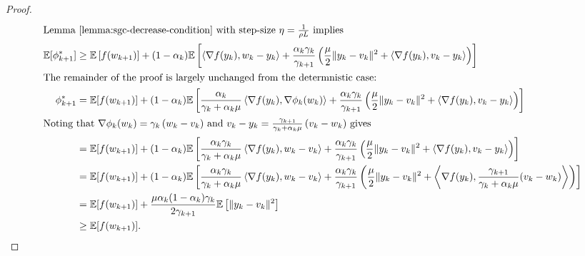 \begin{proof}
\begin{align*}
        \intertext{Lemma~\ref{lemma:sgc-decrease-condition} with step-size \( \eta = \frac{1}{\rho L} \) implies }
        \mathbb{E}[\phi_{k+1}^*] &\geq \mathbb{E}\left[f(w_{k+1})\right] + (1-\alpha_k) \mathbb{E}\left[\left\langle\nabla f(y_k), w_k - y_k\right\rangle + \frac{\alpha_k\gamma_k}{\gamma_{k+1}}\left(\frac{\mu}{2} \|y_k - v_k\|^2 + \left\langle\nabla f(y_k), v_k - y_k\right\rangle\right)\right] \\
        \intertext{The remainder of the proof is largely unchanged from the determnistic case:}
        \phi_{k+1}^*  &=  \mathbb{E}[f(w_{k+1})] + (1-\alpha_k) \mathbb{E}\left[\frac{\alpha_k}{\gamma_k + \alpha_k \mu} \left\langle\nabla f(y_k), \nabla\phi_k(w_k)\right\rangle + \frac{\alpha_k\gamma_k}{\gamma_{k+1}}\left(\frac{\mu}{2} \|y_k - v_k\|^2 + \left\langle\nabla f(y_k), v_k - y_k\right\rangle\right)\right] \\
        \intertext{Noting that \( \nabla \phi_k(w_k) = \gamma_k \left(w_k- v_k\right) \) and \( v_k - y_k= \frac{\gamma_{k+1}}{\gamma_k + \alpha_k \mu}\left(v_k - w_k\right) \) gives }
        &= \mathbb{E}[f(w_{k+1})] +(1-\alpha_k) \mathbb{E}\left[\frac{\alpha_k \gamma_k}{\gamma_k + \alpha_k \mu} \left\langle\nabla f(y_k), w_k - v_k\right\rangle + \frac{\alpha_k\gamma_k}{\gamma_{k+1}}\left(\frac{\mu}{2} \|y_k - v_k\|^2 + \left\langle\nabla f(y_k), v_k - y_k\right\rangle\right)\right] \\
        &= \mathbb{E}[f(w_{k+1})] + (1-\alpha_k) \mathbb{E}\left[\frac{\alpha_k \gamma_k}{\gamma_k + \alpha_k \mu} \left\langle\nabla f(y_k), w_k - v_k\right\rangle + \frac{\alpha_k\gamma_k}{\gamma_{k+1}}\left(\frac{\mu}{2} \|y_k - v_k\|^2 + \left\langle\nabla f(y_k), \frac{\gamma_{k+1}}{\gamma_k + \alpha_k \mu}(v_k - w_k)\right\rangle\right)\right] \\
        &= \mathbb{E}[f(w_{k+1})] + \frac{\mu \alpha_k(1-\alpha_k)\gamma_k}{2 \gamma_{k+1}} \mathbb{E}\left[\|y_k - v_k\|^2\right] \\
        &\geq \mathbb{E}[f(w_{k+1})].
    \end{align*}
\end{proof}


